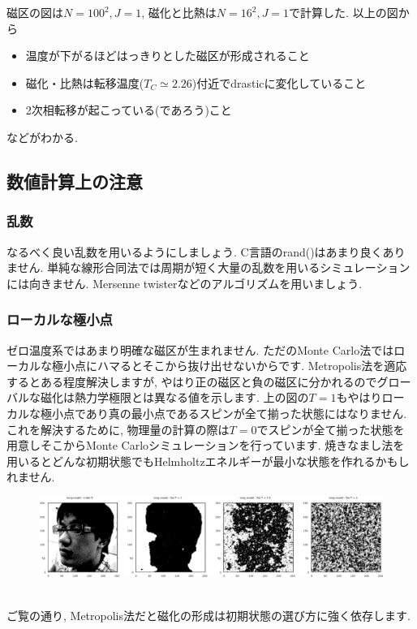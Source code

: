 \documentclass[10.5pt,a4paper]{jreport}
\begin{document}
磁区の図は$N=100^2, J=1$, 磁化と比熱は$N=16^2, J=1$で計算した. 以上の図から
\begin{itemize}
\item 温度が下がるほどはっきりとした磁区が形成されること
\item 磁化・比熱は転移温度($T_C \simeq 2.26$)付近でdrasticに変化していること
\item 2次相転移が起こっている(であろう)こと
\end{itemize}
などがわかる.

\subsection{数値計算上の注意}
\subsubsection{乱数}
なるべく良い乱数を用いるようにしましょう. C言語のrand()はあまり良くありません. 単純な線形合同法では周期が短く大量の乱数を用いるシミュレーションには向きません. Mersenne twisterなどのアルゴリズムを用いましょう.
\subsubsection{ローカルな極小点}
ゼロ温度系ではあまり明確な磁区が生まれません. ただのMonte Carlo法ではローカルな極小点にハマるとそこから抜け出せないからです. Metropolis法を適応するとある程度解決しますが, やはり正の磁区と負の磁区に分かれるのでグローバルな磁化は熱力学極限とは異なる値を示します. 上の図の$T=1$もやはりローカルな極小点であり真の最小点であるスピンが全て揃った状態にはなりません. これを解決するために, 物理量の計算の際は$T=0$でスピンが全て揃った状態を用意しそこからMonte Carloシミュレーションを行っています. 焼きなまし法を用いるとどんな初期状態でもHelmholtzエネルギーが最小な状態を作れるかもしれません.
\begin{figure}[htbp]
  \begin{center}
    \includegraphics[width = 17cm]{./Dai.eps}
  \end{center}
  \label{Dai}
\end{figure}\\
ご覧の通り, Metropolis法だと磁化の形成は初期状態の選び方に強く依存します.
\end{document}
